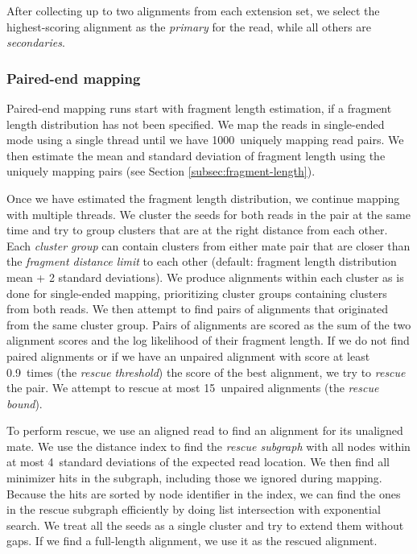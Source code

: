 \documentclass[11pt]{ucscthesis}
\newcommand{\param}[1]{\emph{#1}}
\newcommand{\vocab}[1]{\emph{#1}}
\begin{document}
After collecting up to two alignments from each extension set, we select the highest-scoring alignment as the \vocab{primary} for the read, while all others are \vocab{secondaries}.

\subsubsection{Paired-end mapping}

Paired-end mapping runs start with fragment length estimation, if a fragment length distribution has not been specified.
We map the reads in single-ended mode using a single thread until we have 1000~uniquely mapping read pairs.
We then estimate the mean and standard deviation of fragment length using the uniquely mapping pairs (see Section \ref{subsec:fragment-length}).

Once we have estimated the fragment length distribution, we continue mapping with multiple threads.
We cluster the seeds for both reads in the pair at the same time and try to group clusters that are at the right distance from each other.
Each \vocab{cluster group} can contain clusters from either mate pair that are closer than the \param{fragment distance limit} to each other (default: fragment length distribution mean + 2 standard deviations).
We produce alignments within each cluster as is done for single-ended mapping, prioritizing cluster groups containing clusters from both reads.
We then attempt to find pairs of alignments that originated from the same cluster group.
Pairs of alignments are scored as the sum of the two alignment scores and the log likelihood of their fragment length.
If we do not find paired alignments or if we have an unpaired alignment with score at least 0.9~times (the \param{rescue threshold}) the score of the best alignment, we try to \vocab{rescue} the pair.
We attempt to rescue at most 15~unpaired alignments (the \param{rescue bound}).

To perform rescue, we use an aligned read to find an alignment for its unaligned mate. We use the distance index to find the \vocab{rescue subgraph} with all nodes within at most 4~standard deviations of the expected read location.
We then find all minimizer hits in the subgraph, including those we ignored during mapping.
Because the hits are sorted by node identifier in the index, we can find the ones in the rescue subgraph efficiently by doing list intersection with exponential search.
We treat all the seeds as a single cluster and try to extend them without gaps.
If we find a full-length alignment, we use it as the rescued alignment.
\end{document}
